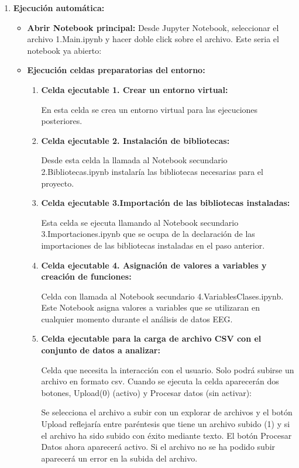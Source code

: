 \begin{enumerate}
\def\labelenumi{\arabic{enumi}.}
\tightlist
\item \textbf{Ejecución automática:}
  \begin{itemize}
   \tightlist
   \item
    \textbf{Abrir Notebook principal:} Desde Jupyter Notebook, seleccionar el archivo 1.Main.ipynb y hacer doble click sobre el archivo. Este seria el notebook ya abierto:
    
   \item
   \textbf{Ejecución celdas preparatorias del entorno: }
	\begin{enumerate}
	\def\labelenumi{\arabic{enumi}.}
	\tightlist
	\item 
	\textbf{Celda ejecutable 1. Crear un entorno virtual: }
	
	En esta celda se crea un entorno virtual para las ejecuciones posteriores.
	\item 
	\textbf{Celda ejecutable 2. Instalación de bibliotecas:}
	
	Desde esta celda la llamada al Notebook secundario 2.Bibliotecas.ipynb instalaría las bibliotecas necesarias para el proyecto.
	\item 
	\textbf{Celda ejecutable 3.Importación de las bibliotecas instaladas:}
	
	Esta celda se ejecuta llamando al Notebook secundario 3.Importaciones.ipynb que se ocupa de la declaración de las importaciones de las bibliotecas instaladas en el paso anterior.
	
	\item 
	\textbf{Celda ejecutable 4. Asignación de valores a variables y creación de funciones:}
	
	Celda con llamada al Notebook secundario 4.VariablesClases.ipynb. Este Notebook asigna valores a variables que se utilizaran en cualquier momento durante el análisis de datos EEG.
	
	\item 
	\textbf{Celda ejecutable para la carga de archivo CSV con el conjunto de datos a analizar:}
	
	Celda que necesita la interacción con el usuario. Solo podrá subirse un archivo en formato csv. Cuando se ejecuta la celda aparecerán dos botones, Upload(0) (activo) y Procesar datos (sin activar):
	
	
	Se selecciona el archivo a subir con un explorar de archivos y el botón Upload reflejaría entre paréntesis que tiene un archivo subido (1) y si el archivo ha sido subido con éxito mediante texto. El botón Procesar Datos ahora aparecerá activo. Si el archivo no se ha podido subir aparecerá un error en la subida del archivo.
	

\end{enumerate}
\end{itemize}
\end{enumerate}

